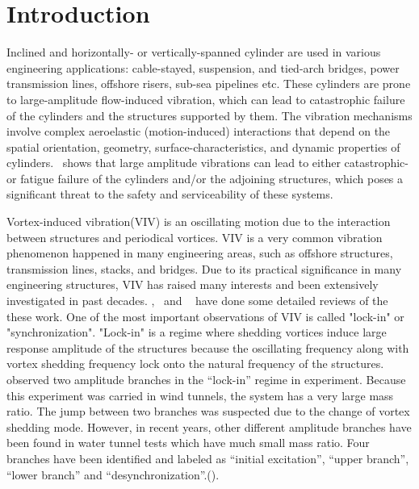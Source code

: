 \section{Introduction}
\label{sec:intro}
%
Inclined and horizontally- or vertically-spanned cylinder are used in various
engineering applications: cable-stayed, suspension, and tied-arch bridges,
power transmission lines, offshore risers, sub-sea pipelines etc. These
cylinders are prone to large-amplitude flow-induced vibration, which can lead
to catastrophic failure of the cylinders and the structures supported by them.
The vibration mechanisms involve complex aeroelastic (motion-induced)
interactions that depend on the spatial orientation, geometry,
surface-characteristics, and dynamic properties of
cylinders.~\cite{davenport1995dynamics} shows that large amplitude vibrations
can lead to either catastrophic- or fatigue failure of the cylinders and/or the
adjoining structures, which poses a significant threat to the safety and
serviceability of these systems.

Vortex-induced vibration(VIV) is an oscillating motion due to the interaction
between structures and periodical vortices. VIV is a very common vibration
phenomenon happened in many engineering areas, such as offshore structures,
transmission lines, stacks, and bridges. Due to its practical significance in
many engineering structures, VIV has raised many interests and been extensively
investigated in past decades.
\cite{bearman1984vortex},~\cite{sarpkaya2004critical} and
~\cite{williamson2004vortex} have done some detailed reviews of the these work.
One of the most important observations of VIV is called "lock-in" or
"synchronization". "Lock-in" is a regime where shedding vortices induce large
response amplitude of the structures because the oscillating frequency along
with vortex shedding frequency lock onto the natural frequency of the
structures. ~\cite{feng1968measurement} observed two amplitude branches in the
``lock-in'' regime in experiment. Because this experiment was carried in wind
tunnels, the system has a very large mass ratio. The jump between two branches
was suspected due to the change of vortex shedding mode.    However, in recent
years, other different amplitude branches have been found in water tunnel tests
which have much small mass ratio. Four branches have been identified and
labeled as ``initial excitation'', ``upper branch'', ``lower branch'' and
``desynchronization''.(\cite{khalak1997fluid}). 

